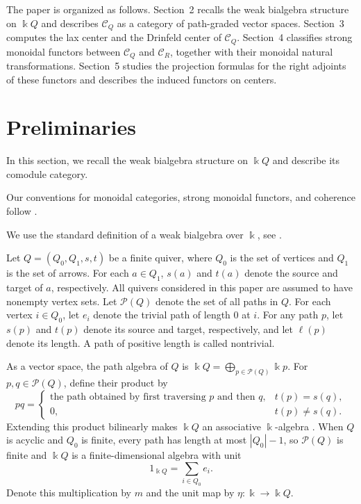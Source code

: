 \documentclass{amsart}
\theoremstyle{definition}
\theoremstyle{remark}
\numberwithin{equation}{section}
\begin{document}
The paper is organized as follows. Section~2 recalls the weak bialgebra
structure on $\Bbbk Q$ and describes $\mathcal C_Q$ as a category of
path-graded vector spaces. Section~3 computes the lax center and the Drinfeld
center of $\mathcal C_Q$. Section~4 classifies strong monoidal functors between
$\mathcal C_Q$ and $\mathcal C_R$, together with their monoidal natural
transformations. Section~5 studies the projection formulas for the right
adjoints of these functors and describes the induced functors on centers.

\section{Preliminaries}

In this section, we recall the weak bialgebra structure on
$\Bbbk Q$ and describe its comodule category.

Our conventions for monoidal categories, strong monoidal functors, and
coherence follow
\cite{ML1998,EGNO2015}.


We use the standard definition of a weak bialgebra over $\Bbbk$, see
\cite{BNS1999}.

Let
$Q=(Q_0,Q_1,s,t)$
be a finite quiver, where $Q_0$ is the set of vertices and $Q_1$ is the set of arrows.
For each $a\in Q_1$, $s(a)$ and $t(a)$ denote the source and target of $a$, respectively.
All quivers considered in this paper are assumed to have nonempty vertex sets.
Let $\mathcal P(Q)$ denote the set of all paths in $Q$.
For each vertex $i\in Q_0$, let $e_i$ denote the trivial path of length $0$ at $i$.
For any path $p$, let $s(p)$ and $t(p)$ denote its source and target, respectively,
and let $\ell(p)$ denote its length.
A path of positive length is called nontrivial.



As a vector space, the path algebra of $Q$ is
$\Bbbk Q=\bigoplus_{p\in\mathcal P(Q)}\Bbbk p$.
For $p,q\in\mathcal P(Q)$, define their product by
\[
pq=
\begin{cases}
\text{the path obtained by first traversing $p$ and then $q$},
&t(p)=s(q),\\
0,&t(p)\neq s(q).
\end{cases}
\]
Extending this product bilinearly makes $\Bbbk Q$ an associative
$\Bbbk$-algebra
\cite{ASS2006,DW2005,
S2014}.
When $Q$ is acyclic and $Q_0$ is finite, every path has length at most
$|Q_0|-1$, so $\mathcal P(Q)$ is finite and $\Bbbk Q$ is a
finite-dimensional algebra with unit
\[
1_{\Bbbk Q}=\sum_{i\in Q_0}e_i.
\]
Denote this multiplication by $m$ and the unit map by
$\eta\colon \Bbbk\to \Bbbk Q$.
\end{document}
